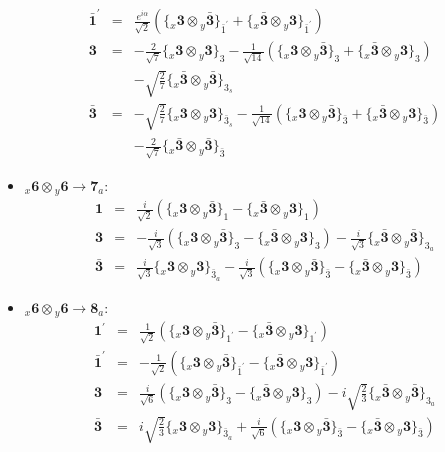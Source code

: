 \documentclass[english]{article}
\newcommand{\rep}[1]{\mathbf{#1}}
\newcommand{\repx}[2]{{}_{#2}\mathbf{#1}}
\newcommand{\subcg}[3]{\big\{ \repx{#1}{x}\otimes\repx{#2}{y}\big\}^{}_{#3}}
\begin{document}
\begin{itemize}
\begin{eqnarray*}
\\
\rep{\bar{1}^{\prime}} &=& \frac{e^{i \alpha }}{\sqrt{2}}\left(\subcg{3}{\bar{3}}{\bar{1}^{\prime}}+\subcg{\bar{3}}{3}{\bar{1}^{\prime}}\right)
\\
\rep{3} &=& -\frac{2}{\sqrt{7}}\subcg{3}{3}{3}-\frac{1}{\sqrt{14}}\left(\subcg{3}{\bar{3}}{3}+\subcg{\bar{3}}{3}{3}\right) \\ 
 & & -\sqrt{\frac{2}{7}}\subcg{\bar{3}}{\bar{3}}{3_{s}}
\\
\rep{\bar{3}} &=& -\sqrt{\frac{2}{7}}\subcg{3}{3}{\bar{3}_{s}}-\frac{1}{\sqrt{14}}\left(\subcg{3}{\bar{3}}{\bar{3}}+\subcg{\bar{3}}{3}{\bar{3}}\right) \\ 
 & & -\frac{2}{\sqrt{7}}\subcg{\bar{3}}{\bar{3}}{\bar{3}}
\end{eqnarray*}
\item $\repx{6}{x}\otimes\repx{6}{y}\to\rep{7}_{a}$:
\begin{eqnarray*}
\rep{1} &=& \frac{i}{\sqrt{2}}\left(\subcg{3}{\bar{3}}{1}-\subcg{\bar{3}}{3}{1}\right)
\\
\rep{3} &=& -\frac{i}{\sqrt{3}}\left(\subcg{3}{\bar{3}}{3}-\subcg{\bar{3}}{3}{3}\right)-\frac{i}{\sqrt{3}}\subcg{\bar{3}}{\bar{3}}{3_{a}}
\\
\rep{\bar{3}} &=& \frac{i}{\sqrt{3}}\subcg{3}{3}{\bar{3}_{a}}-\frac{i}{\sqrt{3}}\left(\subcg{3}{\bar{3}}{\bar{3}}-\subcg{\bar{3}}{3}{\bar{3}}\right)
\end{eqnarray*}
\item $\repx{6}{x}\otimes\repx{6}{y}\to\rep{8}_{a}$:
\begin{eqnarray*}
\rep{1^{\prime}} &=& \frac{1}{\sqrt{2}}\left(\subcg{3}{\bar{3}}{1^{\prime}}-\subcg{\bar{3}}{3}{1^{\prime}}\right)
\\
\rep{\bar{1}^{\prime}} &=& -\frac{1}{\sqrt{2}}\left(\subcg{3}{\bar{3}}{\bar{1}^{\prime}}-\subcg{\bar{3}}{3}{\bar{1}^{\prime}}\right)
\\
\rep{3} &=& \frac{i}{\sqrt{6}}\left(\subcg{3}{\bar{3}}{3}-\subcg{\bar{3}}{3}{3}\right)-i \sqrt{\frac{2}{3}}\subcg{\bar{3}}{\bar{3}}{3_{a}}
\\
\rep{\bar{3}} &=& i \sqrt{\frac{2}{3}}\subcg{3}{3}{\bar{3}_{a}}+\frac{i}{\sqrt{6}}\left(\subcg{3}{\bar{3}}{\bar{3}}-\subcg{\bar{3}}{3}{\bar{3}}\right)
\end{eqnarray*}
\end{itemize}
\end{document}
